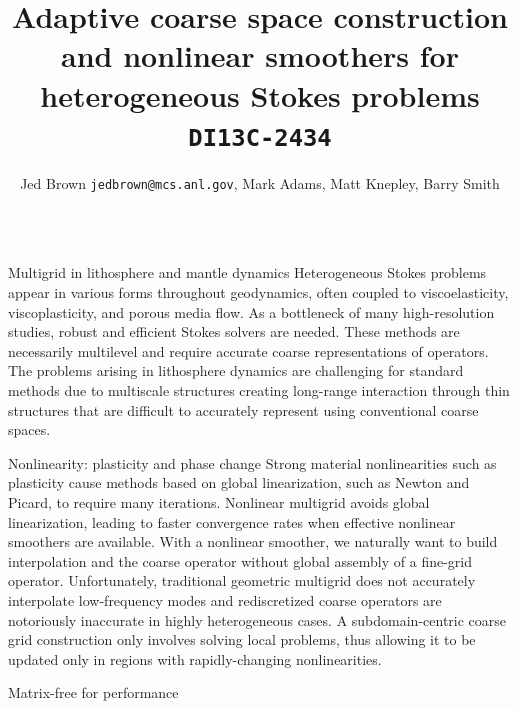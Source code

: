 \documentclass[final,t]{beamer}
\title{\huge Adaptive coarse space construction and nonlinear smoothers for heterogeneous Stokes problems {\normalsize \texttt{DI13C-2434}}}
\author[Jed Brown]{Jed Brown {\texttt{jedbrown@mcs.anl.gov}}, Mark Adams, Matt Knepley, Barry Smith}
\institute[MCS]{Download this poster from \url{http://59A2.org/files/201212-AGUMultigrid.pdf}}
\begin{document}
\begin{frame}{} 
  \vspace{-3em}
  \begin{columns}
    \begin{column}{0.31\textwidth}
      \begin{block}{Multigrid in lithosphere and mantle dynamics}
        Heterogeneous Stokes problems appear in various forms throughout geodynamics, often coupled to viscoelasticity, viscoplasticity, and porous media flow.
        As a bottleneck of many high-resolution studies, robust and efficient Stokes solvers are needed.
        These methods are necessarily multilevel and require accurate coarse representations of operators.
        The problems arising in lithosphere dynamics are challenging for standard methods due to multiscale structures creating long-range interaction through thin structures that are difficult to accurately represent using conventional coarse spaces.
      \end{block}
      \vspace{-1.5em}
      \begin{block}{Nonlinearity: plasticity and phase change}
        Strong material nonlinearities such as plasticity cause methods based on global linearization, such as Newton and Picard, to require many iterations.
        Nonlinear multigrid avoids global linearization, leading to faster convergence rates when effective nonlinear smoothers are available.
        With a nonlinear smoother, we naturally want to build interpolation and the coarse operator without global assembly of a fine-grid operator.
        Unfortunately, traditional geometric multigrid does not accurately interpolate low-frequency modes and rediscretized coarse operators are notoriously inaccurate in highly heterogeneous cases.
        A subdomain-centric coarse grid construction only involves solving local problems, thus allowing it to be updated only in regions with rapidly-changing nonlinearities.
      \end{block}
      \vspace{-1.5em}
      \begin{block}{Matrix-free for performance}

\end{block}
\end{column}
\end{columns}
\end{frame}
\end{document}

